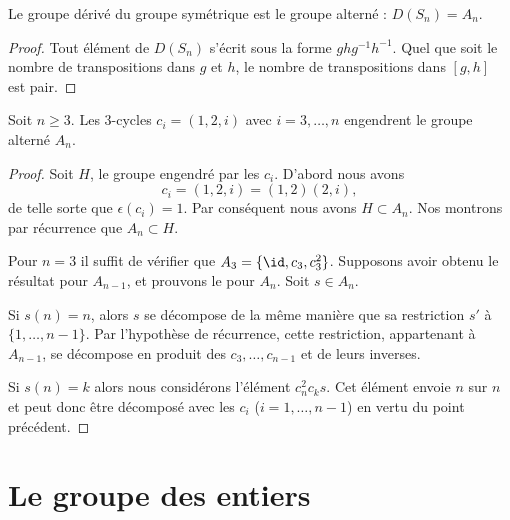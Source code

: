 \begin{lemma}   \label{LemiApyfp}
    Le groupe dérivé du groupe symétrique est le groupe alterné : \( D(S_n)=A_n\).
\end{lemma}

\begin{proof}
    Tout élément de \( D(S_n)\) s'écrit sous la forme \( ghg^{-1}h^{-1}\). Quel que soit le nombre de transpositions dans \( g\) et \( h\), le nombre de transpositions dans \( [g,h]\) est pair.
\end{proof}

\begin{proposition}
    Soit \( n\geq 3\). Les \( 3\)-cycles \( c_i=(1,2,i)\) avec \( i=3,\ldots, n\) engendrent le groupe alterné \( A_n\).
\end{proposition}

\begin{proof}
    Soit \( H\), le groupe engendré par les \( c_i\). D'abord nous avons 
    \begin{equation}
        c_i=(1,2,i)=(1,2)(2,i),
    \end{equation}
    de telle sorte que \( \epsilon(c_i)=1\). Par conséquent nous avons \( H\subset A_n\). Nos montrons par récurrence que \( A_n\subset H\).

    Pour \( n=3\) il suffit de vérifier que \( A_3=\{ \id,c_3,c_3^2 \}\). Supposons avoir obtenu le résultat pour \(A_{n-1}\), et prouvons le pour \( A_n\). Soit \( s\in A_n\).

    Si \( s(n)=n\), alors \( s\) se décompose de la même manière que sa restriction \( s'\) à \( \{ 1,\ldots, n-1 \}\). Par l'hypothèse de récurrence, cette restriction, appartenant à \( A_{n-1}\),  se décompose en produit des \( c_3,\ldots, c_{n-1}\) et de leurs inverses.

    Si \( s(n)=k\) alors nous considérons l'élément \( c^2_nc_ks\). Cet élément envoie \( n\) sur \( n\) et peut donc être décomposé avec les \( c_i\) (\( i=1,\ldots, n-1\)) en vertu du point précédent.
\end{proof}


\section{Le groupe des entiers}

